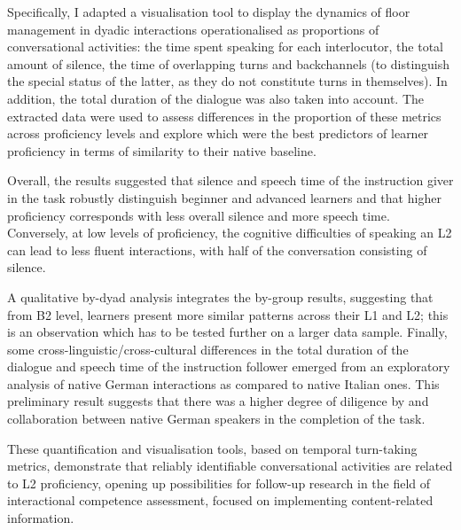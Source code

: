 \begin{stylecaption}
\textup{Specifically, I adapted a visualisation tool to display the dynamics of floor management in dyadic interactions operationalised as proportions of conversational activities: the time spent speaking for each interlocutor, the total amount of silence, the time of overlapping turns and backchannels (to distinguish the special status of the latter, as they do not constitute turns in themselves). In addition, the total duration of the dialogue was also taken into account. The extracted data were used to assess differences in the proportion of these metrics across proficiency levels and explore which were the best predictors of learner proficiency in terms of similarity to their native baseline.}
\end{stylecaption}

\begin{stylecaption}
\textup{Overall, the results suggested that silence and speech time of the instruction giver in the task robustly distinguish beginner and advanced learners and that higher proficiency corresponds with less overall silence and more speech time. Conversely, at low levels of proficiency, the cognitive difficulties of speaking an L2 can lead to less fluent interactions, with half of the conversation consisting of silence.} 
\end{stylecaption}

\begin{stylecaption}
\textup{A qualitative by-dyad analysis integrates the by-group results, suggesting that from B2 level, learners present more similar patterns across their L1 and L2; this is an observation which has to be tested further on a larger data sample. Finally, some cross-linguistic/cross-cultural differences in the total duration of the dialogue and speech time of the instruction follower emerged from an exploratory analysis of native German interactions as compared to native Italian ones. This preliminary result suggests that there was a higher degree of diligence by and collaboration between native German speakers in the completion of the task.} 
\end{stylecaption}

\begin{stylecaption}
\textup{These quantification and visualisation tools, based on temporal turn-taking metrics, demonstrate that reliably identifiable conversational activities are related to L2 proficiency, opening up possibilities for follow-up research in the field of interactional competence assessment, focused on implementing content-related information.}
\end{stylecaption}

